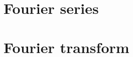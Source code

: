 \documentclass[a4paper,12pt]{book}
\theoremstyle{plain}
\theoremstyle{plain}
\theoremstyle{plain}
\theoremstyle{plain}
\theoremstyle{definition}
\theoremstyle{definition}
\begin{document}
\chapter{Fourier series}
\label{chap:series}

\vfill\pagebreak

\shipoutAnswer
\vfill\pagebreak

\shipoutAnswer
\chapter{Fourier transform}
\label{chap:transform}

\vfill\pagebreak

\end{document}
